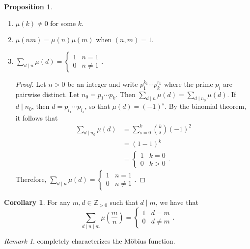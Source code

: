 \documentclass[10pt,letterpaper,cm]{nupset}
\theoremstyle{definition}
\theoremstyle{theorem}
\newtheorem{prop}[definition]{Proposition}
\newtheorem{corollary}[definition]{Corollary}
\theoremstyle{remark}
\newtheorem{remark}[definition]{Remark}
\newcommand{\Z}{\mathbb Z}
\newcommand{\1}{\mathbf{1}}
\newcommand{\0}{\vec 0}
\begin{document}
\begin{prop}\label{mob} $ $
\begin{enumerate}[label=(\roman*)]
\item $\mu(k) \ne 0$ for some $k$.
\item $\mu(nm) = \mu(n) \mu(m)$ when $\left(n,m\right) = 1$.
\item $\sum_{d\mid n}\mu(d) = \begin{cases} 1 & n=1 \\ 0 & n \ne 1 \end{cases}.$
\begin{proof} Let $n>0$ be an integer and write $p_1^{k_1}\cdots p_k^{r_k}$ where the prime $p_i$ are pairwise distinct. Let $n_0 = p_1\cdots p_k$. Then $\sum_{d\mid n}\mu(d) =\sum_{d\mid n_0} \mu(d)$. If $d\mid n_0$, then $d= p_{i_1}\cdots p_{i_s}$, so that $\mu(d) = \left({-1}\right)^s$. By the binomial theorem, it follows that \begin{align*} \sum_{d\mid n_0}\mu(d) & = \sum_{s=0}^k {k\choose s}({-1})^2\\ & = \left(1-1\right)^k
\\ & =\begin{cases} 1 & k=0 \\ 0 & k>0 \end{cases}  . \end{align*}
Therefore, $\sum_{d\mid n}\mu(d) = \begin{cases} 1 & n=1 \\ 0 & n \ne 1 \end{cases}.$
\end{proof}
\end{enumerate}
\end{prop}


\begin{corollary}
For any $m, d\in \Z_{>0}$ such that $d\mid m$, we have that $$\sum_{d\mid n \mid m}\mu \left(\frac{m}{n} \right) = \begin{cases}  1 & d = m \\ 0 & d\ne m\end{cases}.$$
\end{corollary}


\begin{remark}
 completely characterizes the M\"{o}bius function.
\end{remark}
\end{document}

